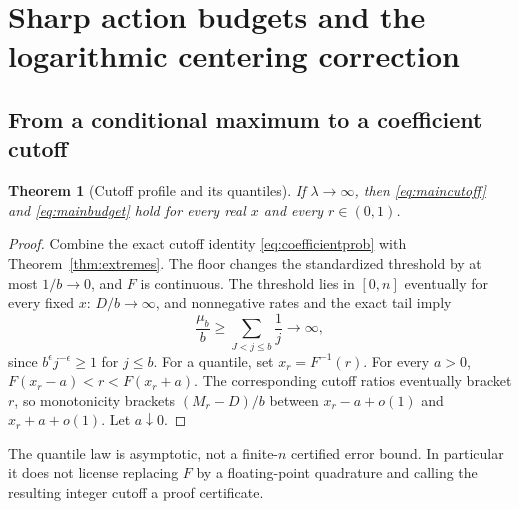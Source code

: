 \documentclass[11pt,a4paper]{article}
\numberwithin{equation}{section}
\newtheorem{theorem}{Theorem}[section]
\theoremstyle{definition}
\theoremstyle{remark}
\newcommand{\ee}{\epsilon}
\begin{document}
\section{Sharp action budgets and the logarithmic centering correction}
\label{sec:budgets}

\subsection{From a conditional maximum to a coefficient cutoff}
\begin{theorem}[Cutoff profile and its quantiles]\label{thm:budget}
If $\lambda\to\infty$, then \eqref{eq:maincutoff} and
\eqref{eq:mainbudget} hold for every real $x$ and every $r\in(0,1)$.
\end{theorem}
\begin{proof}
Combine the exact cutoff identity \eqref{eq:coefficientprob} with
Theorem~\ref{thm:extremes}. The floor changes the standardized threshold
by at most $1/b\to0$, and $F$ is continuous.
The threshold lies in $[0,n]$ eventually for every fixed $x$: $D/b\to\infty$,
and nonnegative rates and the exact tail imply
\[
 \frac{\mu_b}{b}\ge\sum_{J<j\le b}\frac1j\longrightarrow\infty,
\]
since $b^\ee j^{-\ee}\ge1$ for $j\le b$.
For a quantile, set $x_r=F^{-1}(r)$. For every $a>0$,
$F(x_r-a)<r<F(x_r+a)$. The corresponding cutoff ratios eventually bracket
$r$, so monotonicity brackets $(M_r-D)/b$ between $x_r-a+o(1)$ and
$x_r+a+o(1)$. Let $a\downarrow0$.
\end{proof}

The quantile law is asymptotic, not a finite-$n$ certified error bound.
In particular it does not license replacing $F$ by a floating-point
quadrature and calling the resulting integer cutoff a proof certificate.
\end{document}
